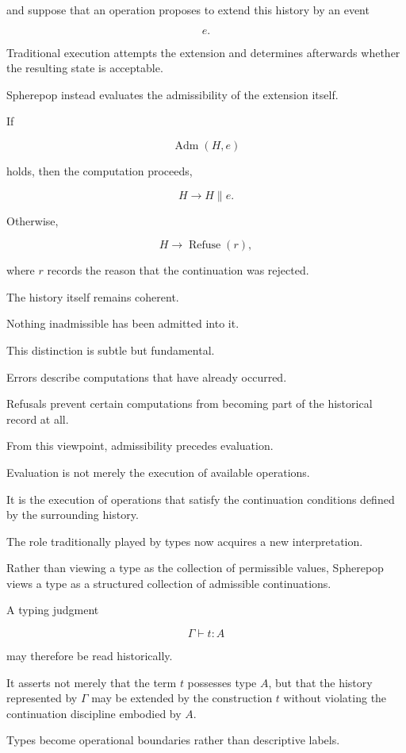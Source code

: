 \documentclass[12pt,oneside]{article}
\theoremstyle{definition}
\theoremstyle{remark}
\begin{document}
and suppose that an operation proposes to extend this history by an event

\[
e.
\]

Traditional execution attempts the extension and determines afterwards whether
the resulting state is acceptable.

Spherepop instead evaluates the admissibility of the extension itself.

If

\[
\operatorname{Adm}(H,e)
\]

holds, then the computation proceeds,

\[
H
\longrightarrow
H \mathbin{\|} e.
\]

Otherwise,

\[
H
\longrightarrow
\operatorname{Refuse}(r),
\]

where \(r\) records the reason that the continuation was rejected.

The history itself remains coherent.

Nothing inadmissible has been admitted into it.

This distinction is subtle but fundamental.

Errors describe computations that have already occurred.

Refusals prevent certain computations from becoming part of the historical
record at all.

From this viewpoint, admissibility precedes evaluation.

Evaluation is not merely the execution of available operations.

It is the execution of operations that satisfy the continuation conditions
defined by the surrounding history.

The role traditionally played by types now acquires a new interpretation.

Rather than viewing a type as the collection of permissible values, Spherepop
views a type as a structured collection of admissible continuations.

A typing judgment

\[
\Gamma \vdash t : A
\]

may therefore be read historically.

It asserts not merely that the term \(t\) possesses type \(A\), but that the
history represented by \(\Gamma\) may be extended by the construction \(t\)
without violating the continuation discipline embodied by \(A\).

Types become operational boundaries rather than descriptive labels.
\end{document}
